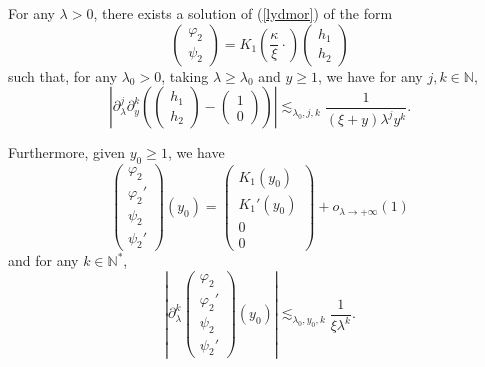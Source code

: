 \documentclass[10pt,a4paper]{amsart}
\begin{document}
\begin{lem}
  \label{factexp}For any $\lambda > 0$, there exists a solution of
  (\ref{lydmor}) of the form
  \[ \left(\begin{array}{c}
       \varphi_2\\
       \psi_2
     \end{array}\right) =  K_1 \left( \frac{\kappa}{\xi} \cdot \right)
     \left(\begin{array}{c}
       h_1\\
       h_2
     \end{array}\right) \]
such that, for any $\lambda_0 > 0$, taking $\lambda \geqslant \lambda_0$ and
  $y \geqslant 1$, we have for any $j, k \in \mathbb{N}$,
  \[ \left| \partial_{\lambda}^j \partial_y^k \left( \left(\begin{array}{c}
       h_1\\
       h_2
     \end{array}\right) - \left(\begin{array}{c}
       1\\
       0
     \end{array}\right) \right) \right| \lesssim_{\lambda_0, j, k}
     \frac{1}{(\xi + y) \lambda^j y^k} . \]
     
  Furthermore, given $y_0 \geqslant 1$, we have
  \[ \left(\begin{array}{c}
       \varphi_2\\
       \varphi_2'\\
       \psi_2\\
       \psi_2'
     \end{array}\right) (y_0) =   
     \left(\begin{array}{c}
       K_1 \left(y_0 \right)\\
       K_1' \left(y_0 \right)\\
       0\\
       0
     \end{array}\right) + o_{\lambda \rightarrow + \infty} (1)  \]
and for any $k \in \mathbb{N}^{\ast}$,
  \[ \left| \partial_{\lambda}^k \left(\begin{array}{c}
       \varphi_2\\
       \varphi_2'\\
       \psi_2\\
       \psi_2'
     \end{array}\right) (y_0) \right| \lesssim_{\lambda_0, y_0, k}
     \frac{1}{\xi \lambda^k} . \]
\end{lem}
\end{document}

